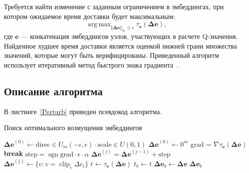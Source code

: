 \documentclass[a4paper]{article}
\DeclareMathOperator{\clipop}{clip}
\DeclareMathOperator{\sgnop}{sgn}
\DeclareMathOperator*{\argmax}{arg\,max}
\newcommand{\edt}{\tau_{\bm{e}}}
\newcommand{\de}{\bm{\Delta e}}
\begin{document}
Требуется найти изменение с заданным ограничением в эмбеддингах, при котором
ожидаемое время доставки будет максимальным:
\[
    \argmax_{\Vert \de \Vert_{\infty} \leq \epsilon}{\edt(\de)},
\]
где $\bm{e}$ --- конкатенация эмбеддингов узлов, участвующих в расчете
Q-значения.\\

Найденное худшее время доставки является оценкой нижней грани множества
значений, которые могут быть верифицированы. Приведенный алгоритм использует
итеративный метод быстрого знака градиента~\cite{iter-fast-grad-sign}.

\subsection{Описание алгоритма}

В листинге~\ref{Perturb} приведен псевдокод алгоритма.

\begin{listing}[H]
\caption{Поиск оптимального возмущения эмбеддингов}\label{Perturb}
\begin{algorithmic}[1]
        \State $\de^{(0)} \gets \text{direc} \in U_m(-\epsilon, \epsilon)
               \cdot \text{scale} \in U(0, 1)$
        \Else
            \State $\de^{(0)} \gets 0^m$
        \EndIf
        \State
            \State grad = $\nabla \edt(\de)$
            \State
                \State \textbf{break}
            \EndIf
            \State
            \State $\text{step} = \sgnop \text{grad} \cdot \epsilon \cdot \alpha$
            \State $\de^{(j)} = \de^{(j-1)} + \text{step}$
            \State
            \If{$\Vert \de^{(j)} \Vert_{\infty} > \epsilon$}
                \State $\de^{(j)} \gets \{v : v = \clipop_\epsilon \Delta e_i\}$
            \EndIf
        \EndFor
        \State
        \State $t \gets \edt{(\de)}$
            \State $t_b \gets t$
            \State $\de_b \gets \de$
        \EndIf
    \EndFor
    \State
    \State \Return $\de_b$
\EndFunction
\end{algorithmic}
\end{listing}
\end{document}
